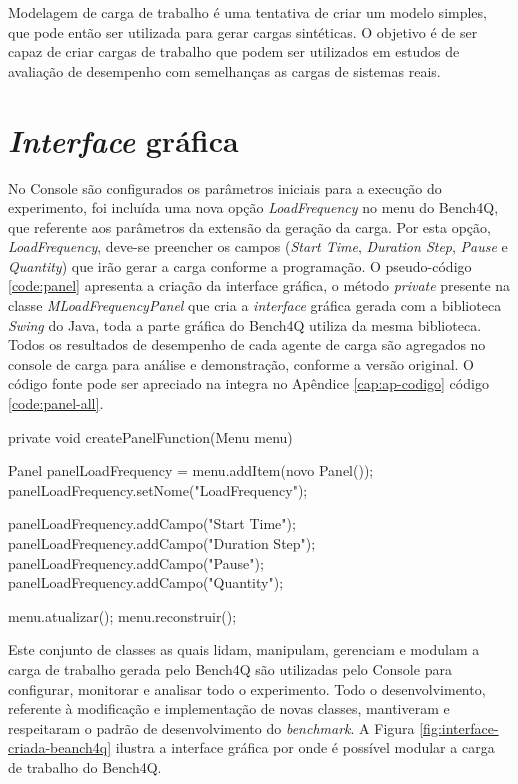 Modelagem de carga de trabalho é uma tentativa de criar um modelo simples, que pode então ser utilizada para gerar cargas sintéticas. O objetivo é de ser capaz de criar cargas de trabalho que podem ser utilizados em estudos de avaliação de desempenho com semelhanças as cargas de sistemas reais. 

\section{\textit{Interface} gráfica}

No Console são configurados os parâmetros iniciais para a execução do experimento, foi incluída uma nova opção \textit{LoadFrequency} no menu do Bench4Q, que referente aos parâmetros da extensão da geração da carga. Por esta opção, \textit{LoadFrequency}, deve-se preencher os campos (\textit{Start Time}, \textit{Duration Step}, \textit{Pause} e \textit{Quantity}) que irão gerar a carga conforme a programação. O pseudo-código \ref{code:panel} apresenta a criação da interface gráfica, o método \textit{private} presente na classe \textit{MLoadFrequencyPanel} que cria a \textit{interface} gráfica gerada com a biblioteca \textit{Swing} do Java, toda a parte gráfica do Bench4Q utiliza da mesma biblioteca. Todos os resultados de desempenho de cada agente de carga são agregados no console de carga para análise e demonstração, conforme a versão original. O código fonte pode ser apreciado na integra no Apêndice \ref{cap:ap-codigo} código \ref{code:panel-all}.

\begin{codigo}[caption={Código para gerar a os parâmetros para a modulação}, label={code:panel}, breaklines=true]
	private void createPanelFunction(Menu menu) {
		
		Panel panelLoadFrequency = menu.addItem(novo Panel());
		panelLoadFrequency.setNome("LoadFrequency");
		
		panelLoadFrequency.addCampo("Start Time");
		panelLoadFrequency.addCampo("Duration Step");
		panelLoadFrequency.addCampo("Pause");
		panelLoadFrequency.addCampo("Quantity");	
		
		menu.atualizar();
		menu.reconstruir();
		
	}
\end{codigo}

Este conjunto de classes as quais lidam, manipulam, gerenciam e modulam a carga de trabalho gerada pelo Bench4Q são utilizadas pelo Console para configurar, monitorar e analisar todo o experimento. Todo o desenvolvimento, referente à modificação e implementação de novas classes, mantiveram e respeitaram o padrão de desenvolvimento do \textit{benchmark}. A Figura \ref{fig:interface-criada-beanch4q} ilustra a interface gráfica por onde é possível modular a carga de trabalho do Bench4Q. 

